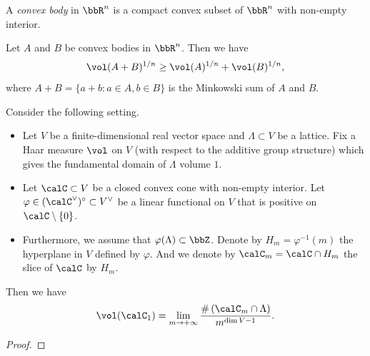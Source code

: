 \begin{definition}
	A \emph{convex body} in $\bbR^n$ is a compact convex subset of $\bbR^n$ with non-empty interior.
	\Yang{}
\end{definition}

\begin{example}
	\Yang{}
\end{example}

\begin{theorem}
	Let $A$ and $B$ be convex bodies in $\bbR^n$.
	Then we have
	\[ \vol(A + B)^{1/n} \geq \vol(A)^{1/n} + \vol(B)^{1/n}, \]
	where $A + B = \{ a + b : a \in A, b \in B \}$ is the Minkowski sum of $A$ and $B$.
	\Yang{}
\end{theorem}

\begin{lemma}
	Consider the following setting.
	\begin{itemize}
		\item Let $V$ be a finite-dimensional real vector space and $\Lambda \subset V$ be a lattice.
		      Fix a Haar measure $\vol$ on $V$ (with respect to the additive group structure) which gives the fundamental domain of $\Lambda$ volume $1$.
		\item Let $\calC \subset V$ be a closed convex cone with non-empty interior.
		      Let $\varphi \in (\calC^\vee)^\circ \subset V^\vee$ be a linear functional on $V$ that is positive on $\calC \setminus \{0\}$.
		\item Furthermore, we assume that $\varphi(\Lambda) \subset \bbZ$.
		      Denote by $H_m = \varphi^{-1}(m)$ the hyperplane in $V$ defined by $\varphi$.
		      And we denote by $\calC_m = \calC \cap H_m$ the slice of $\calC$ by $H_m$.
	\end{itemize}
	Then we have
	\[ \vol(\calC_1) = \lim_{m \to +\infty} \frac{\#\left(\calC_m \cap \Lambda \right)}{m^{\dim V - 1}}. \]

	\Yang{}
\end{lemma}
\begin{proof}

	\Yang{}
\end{proof}






























